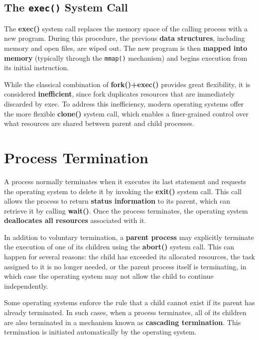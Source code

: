 \subsection{The \texttt{exec()} System Call}

The \textbf{exec()} system call replaces the memory space of the calling process 
with a new program. During this procedure, the previous \textbf{data structures}, 
including memory and open files, are wiped out. The new program is then 
\textbf{mapped into memory} (typically through the \texttt{mmap()} mechanism) 
and begins execution from its initial instruction.  

While the classical combination of \textbf{fork()+exec()} provides great flexibility, 
it is considered \textbf{inefficient}, since fork duplicates resources that are immediately 
discarded by exec. To address this inefficiency, modern operating systems 
offer the more flexible \textbf{clone()} system call, which enables a finer-grained 
control over what resources are shared between parent and child processes.

\section{Process Termination}

A process normally terminates when it executes its last statement and requests 
the operating system to delete it by invoking the \textbf{exit()} system call. 
This call allows the process to return \textbf{status information} to its parent, 
which can retrieve it by calling \textbf{wait()}. 
Once the process terminates, the operating system \textbf{deallocates all resources} 
associated with it.  

In addition to voluntary termination, a \textbf{parent process} may explicitly 
terminate the execution of one of its children using the \textbf{abort()} system call. 
This can happen for several reasons: the child has exceeded its allocated resources, 
the task assigned to it is no longer needed, or the parent process itself is 
terminating, in which case the operating system may not allow the child 
to continue independently.  

Some operating systems enforce the rule that a child cannot exist if its parent 
has already terminated. In such cases, when a process terminates, all of its 
children are also terminated in a mechanism known as \textbf{cascading termination}. 
This termination is initiated automatically by the operating system.  


